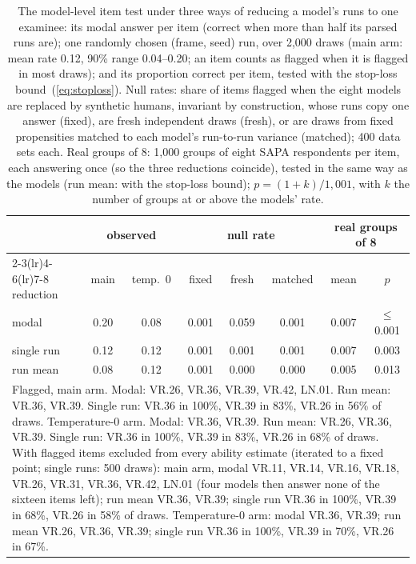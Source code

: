 \begin{table}[t]
\caption{The model-level item test under three ways of reducing a model's runs to one examinee: its modal answer per item (correct when more than half its parsed runs are); one randomly chosen (frame, seed) run, over 2{,}000 draws (main arm: mean rate 0.12, 90\% range 0.04--0.20; an item counts as flagged when it is flagged in most draws); and its proportion correct per item, tested with the stop-loss bound~(\ref{eq:stoploss}). Null rates: share of items flagged when the eight models are replaced by synthetic humans, invariant by construction, whose runs copy one answer (fixed), are fresh independent draws (fresh), or are draws from fixed propensities matched to each model's run-to-run variance (matched); 400 data sets each. Real groups of 8: 1{,}000 groups of eight SAPA respondents per item, each answering once (so the three reductions coincide), tested in the same way as the models (run mean: with the stop-loss bound); $p=(1+k)/1{,}001$, with $k$ the number of groups at or above the models' rate.}
\label{tab:reductions}\centering\footnotesize\setlength{\tabcolsep}{2.5pt}
\begin{tabular}{lccccccc}\toprule
 & \multicolumn{2}{c}{observed} & \multicolumn{3}{c}{null rate} & \multicolumn{2}{c}{real groups of 8} \\\cmidrule(lr){2-3}\cmidrule(lr){4-6}\cmidrule(lr){7-8}
reduction & main & temp.\ 0 & fixed & fresh & matched & mean & $p$ \\\midrule
modal & 0.20 & 0.08 & 0.001 & 0.059 & 0.001 & 0.007 & $\le$0.001 \\
single run & 0.12 & 0.12 & 0.001 & 0.001 & 0.001 & 0.007 & 0.003 \\
run mean & 0.08 & 0.12 & 0.001 & 0.000 & 0.000 & 0.005 & 0.013 \\\midrule
\multicolumn{8}{p{0.93\columnwidth}}{Flagged, main arm. Modal: VR.26, VR.36, VR.39, VR.42, LN.01. Run mean: VR.36, VR.39. Single run: VR.36 in 100\%, VR.39 in 83\%, VR.26 in 56\% of draws. Temperature-0 arm. Modal: VR.36, VR.39. Run mean: VR.26, VR.36, VR.39. Single run: VR.36 in 100\%, VR.39 in 83\%, VR.26 in 68\% of draws. With flagged items excluded from every ability estimate (iterated to a fixed point; single runs: 500 draws): main arm, modal VR.11, VR.14, VR.16, VR.18, VR.26, VR.31, VR.36, VR.42, LN.01 (four models then answer none of the sixteen items left); run mean VR.36, VR.39; single run VR.36 in 100\%, VR.39 in 68\%, VR.26 in 58\% of draws. Temperature-0 arm: modal VR.36, VR.39; run mean VR.26, VR.36, VR.39; single run VR.36 in 100\%, VR.39 in 70\%, VR.26 in 67\%.} \\
\bottomrule\end{tabular}\end{table}
